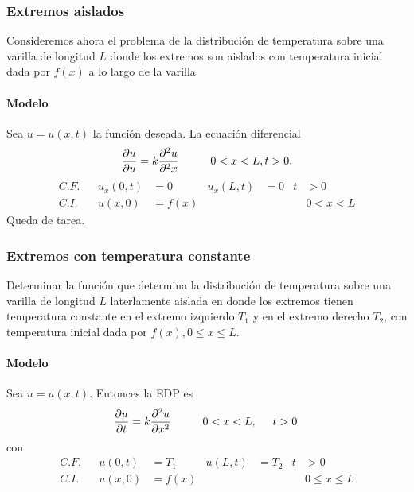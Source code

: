 \documentclass[11pt,letterpaper,draft]{report}
\theoremstyle{plain}
\theoremstyle{definition}
\theoremstyle{remark}
\newcommand\<{\langle}
\renewcommand\>{\rangle}
\begin{document}
\subsubsection{Extremos aislados}
Consideremos ahora el problema de la distribución de temperatura
sobre una varilla de longitud $L$ donde los extremos son aislados
con temperatura inicial dada por $f(x)$ a lo largo de la varilla

\paragraph{Modelo}
Sea $u=u(x,t)$ la función deseada. La ecuación diferencial
\[
  \frac{\partial u}{\partial u}
  =k
  \frac{\partial^2u}{\partial^2x}
  \hspace{10mm} 0<x<L, t>0
.\]
\begin{align*}
  C.F. && u_x(0,t) &= 0 & u_x(L,t) &= 0 &t&>0 \\
  C.I. && u(x,0) &= f(x) & &&& 0<x<L
\end{align*}
Queda de tarea.

\subsubsection{Extremos con temperatura constante}

Determinar la función que determina la distribución de
temperatura sobre una varilla de longitud $L$ laterlamente
aislada en donde los extremos tienen temperatura constante en el
extremo izquierdo $T_1$ y en el extremo derecho $T_2$, con
temperatura inicial dada por $f(x), 0\leq x\leq L$.

\paragraph{Modelo}
Sea $u=u(x,t)$. Entonces la EDP es
\[
  \frac{\partial u}{\partial t}
  = k
  \frac{\partial ^2 u}{\partial x^2}
  \hspace{10mm} 0<x<L,
  \hspace{5mm} t>0.
\]
con
\begin{align*}
  C.F. && u(0,t) &= T_1 & u(L,t) &= T_2 &t&>0 \\
  C.I. && u(x,0) &= f(x) & &&& 0\leq x\leq L
\end{align*}
\end{document}

